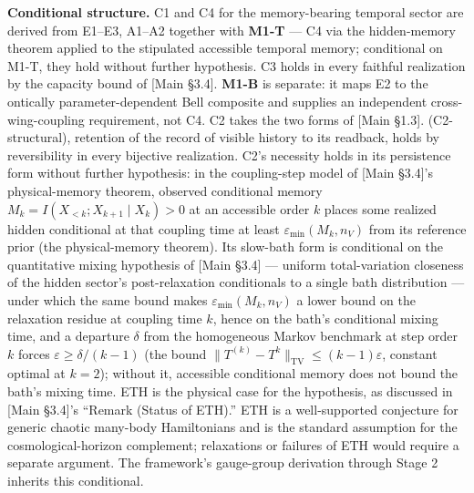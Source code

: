 \documentclass[
]{article}
\begin{document}
\textbf{Conditional structure.} C1 and C4 for the memory-bearing
temporal sector are derived from E1--E3, A1--A2 together with
\textbf{M1-T} --- C4 via the hidden-memory theorem applied to the
stipulated accessible temporal memory; conditional on M1-T, they hold
without further hypothesis. C3 holds in every faithful realization by
the capacity bound of {[}Main §3.4{]}. \textbf{M1-B} is separate: it
maps E2 to the ontically parameter-dependent Bell composite and supplies
an independent cross-wing-coupling requirement, not C4. C2 takes the two
forms of {[}Main §1.3{]}. (C2-structural), retention of the record of
visible history to its readback, holds by reversibility in every
bijective realization. C2's necessity holds in its persistence form
without further hypothesis: in the coupling-step model of {[}Main
§3.4{]}'s physical-memory theorem, observed conditional memory
\(M_k = I(X_{<k}; X_{k+1} \mid X_k) > 0\) at an accessible order \(k\)
places some realized hidden conditional at that coupling time at least
\(\varepsilon_{\min}(M_k, n_V)\) from its reference prior (the
physical-memory theorem). Its slow-bath form is conditional on the
quantitative mixing hypothesis of {[}Main §3.4{]} --- uniform
total-variation closeness of the hidden sector's post-relaxation
conditionals to a single bath distribution --- under which the same
bound makes \(\varepsilon_{\min}(M_k, n_V)\) a lower bound on the
relaxation residue at coupling time \(k\), hence on the bath's
conditional mixing time, and a departure \(\delta\) from the homogeneous
Markov benchmark at step order \(k\) forces
\(\varepsilon \geq \delta/(k-1)\) (the bound
\(\|T^{(k)} - T^k\|_{\mathrm{TV}} \leq (k-1)\varepsilon\), constant
optimal at \(k = 2\)); without it, accessible conditional memory does
not bound the bath's mixing time. ETH is the physical case for the
hypothesis, as discussed in {[}Main §3.4{]}'s ``Remark (Status of
ETH).'' ETH is a well-supported conjecture for generic chaotic many-body
Hamiltonians and is the standard assumption for the cosmological-horizon
complement; relaxations or failures of ETH would require a separate
argument. The framework's gauge-group derivation through Stage 2
inherits this conditional.
\end{document}
